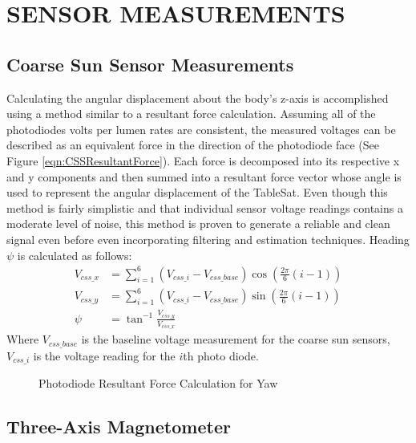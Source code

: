\chapter{SENSOR MEASUREMENTS}
\label{chap:SensorMeasurements}

\section{Coarse Sun Sensor Measurements}

Calculating the angular displacement about the body's z-axis is accomplished using a method similar to a resultant force calculation.  Assuming all of the photodiodes volts per lumen rates are consistent, the measured voltages can be described as an equivalent force in the direction of the photodiode face (See Figure \ref{eqn:CSSResultantForce}).  Each force is decomposed into its respective x and y components and then summed into a resultant force vector whose angle is used to represent the angular displacement of the TableSat.  Even though this method is fairly simplistic and that individual sensor voltage readings contains a moderate level of noise, this method is proven to generate a reliable and clean signal even before even incorporating filtering and estimation techniques.  Heading $\psi$ is calculated as follows:
\begin{subequations}
  \begin{align}
    V_{css\_x} & = \sum\limits_{i=1}^6 (V_{css\_i} - V_{css\_base}) \cos \left( \frac{2\pi}{6} (i-1)\right) \\
    V_{css\_y} & = \sum\limits_{i=1}^6 (V_{css\_i} - V_{css\_base}) \sin \left( \frac{2\pi}{6} (i-1)\right) \\
    \psi & = \tan^{-1} \frac{V_{css\_y}}{V_{css\_x}}
  \end{align}
  \label{eqn:CSSResultantForce}
\end{subequations}
Where $V_{css\_base}$ is the baseline voltage measurement for the coarse sun sensors, $V_{css\_i}$ is the voltage reading for the $i$th photo diode.


\begin{figure}[H]
\centerline{}
\caption{Photodiode Resultant Force Calculation for Yaw}
\label{fig:CSSVectors}
\end{figure}

\section{Three-Axis Magnetometer}
\label{sec:TheeAxisMagnetometer}

